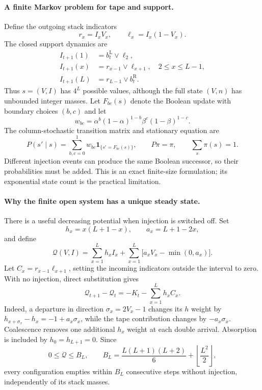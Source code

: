 \documentclass{article}
\begin{document}
\paragraph{A finite Markov problem for tape and support.}
Define the outgoing stack indicators
\begin{equation}
r_x=I_xV_x,\qquad \ell_x=I_x(1-V_x).
\end{equation}
The closed support dynamics are
\begin{align}
I_{t+1}(1)&=b_t^{\mathrm L}\lor\ell_2,\\
I_{t+1}(x)&=r_{x-1}\lor\ell_{x+1},\quad 2\leq x\leq L-1,\\
I_{t+1}(L)&=r_{L-1}\lor b_t^{\mathrm R}.
\end{align}
Thus $s=(V,I)$ has $4^L$ possible values, although the full state $(V,n)$
has unbounded integer masses.  Let $F_{bc}(s)$ denote the Boolean update
with boundary choices $(b,c)$ and let
\begin{equation}
w_{bc}=\alpha^b(1-\alpha)^{1-b}\beta^c(1-\beta)^{1-c}.
\end{equation}
The column-stochastic transition matrix and stationary equation are
\begin{equation}
P(s'\mid s)=\sum_{b,c=0}^1w_{bc}
 \mathbf{1}_{\{s'=F_{bc}(s)\}},\qquad
P\pi=\pi,\qquad \sum_s\pi(s)=1.
\label{eq:boundary-markov}
\end{equation}
Different injection events can produce the same Boolean successor, so their
probabilities must be added.  This is an exact finite-size formulation;
its exponential state count is the practical limitation.

\paragraph{Why the finite open system has a unique steady state.}
There is a useful decreasing potential when injection is switched off.
Set
\begin{equation}
h_x=x(L+1-x),\qquad a_x=L+1-2x,
\end{equation}
and define
\begin{equation}
\mathcal Q(V,I)=\sum_{x=1}^L h_x I_x
 +\sum_{x=1}^L\bigl[a_xV_x-\min(0,a_x)\bigr].
\end{equation}
Let $C_x=r_{x-1}\ell_{x+1}$, setting the incoming indicators outside the
interval to zero.  With no injection, direct substitution gives
\begin{equation}
\boxed{\mathcal Q_{t+1}-\mathcal Q_t
 =-K_t-\sum_{x=1}^L h_x C_x.}
\label{eq:clearing-potential}
\end{equation}
Indeed, a departure in direction $\sigma_x=2V_x-1$ changes its $h$ weight
by $h_{x+\sigma_x}-h_x=-1+a_x\sigma_x$, while the tape contribution
changes by $-a_x\sigma_x$.  Coalescence removes one additional $h_x$
weight at each double arrival.  Absorption is included by $h_0=h_{L+1}=0$.
Since
\begin{equation}
0\leq\mathcal Q\leq B_L,
\qquad
B_L=\frac{L(L+1)(L+2)}{6}+\left\lfloor\frac{L^2}{2}\right\rfloor,
\end{equation}
every configuration empties within $B_L$ consecutive steps without
injection, independently of its stack masses.
\end{document}

